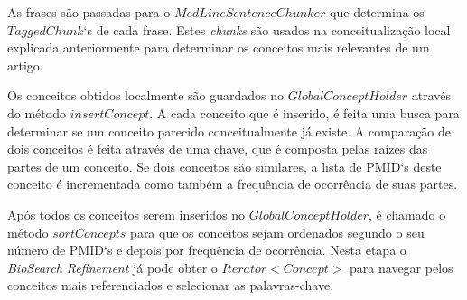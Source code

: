 As frases são passadas para o $MedLineSentenceChunker$ que determina os $TaggedChunk$`s de cada frase. Estes \emph{chunks} são usados na conceitualização local explicada anteriormente para determinar os conceitos mais relevantes de um artigo.

Os conceitos obtidos localmente são guardados no $GlobalConceptHolder$ através do método $insertConcept$. A cada conceito que é inserido, é feita uma busca para determinar se um conceito parecido conceitualmente já existe. A comparação de dois conceitos é feita através de uma chave, que é composta pelas raízes das partes de um conceito. Se dois conceitos são similares, a lista de PMID`s deste conceito é incrementada como também a frequência de ocorrência de suas partes.

Após todos os conceitos serem inseridos no $GlobalConceptHolder$, é chamado o método $sortConcepts$ para que os conceitos sejam ordenados segundo o seu número de PMID`s e depois por frequência de ocorrência. Nesta etapa o \emph{BioSearch Refinement} já pode obter o $Iterator<Concept>$ para navegar pelos conceitos mais referenciados e selecionar as palavras-chave.
